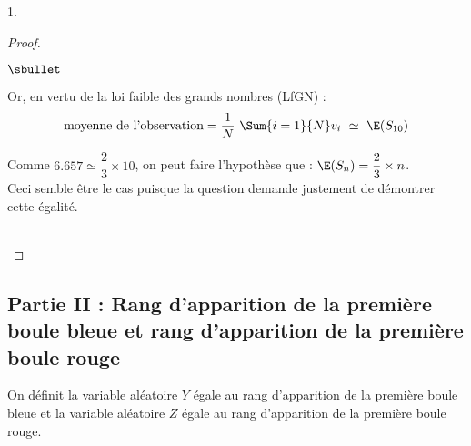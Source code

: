 \documentclass[11pt]{article}%
\begin{document}
\begin{noliste}{1.}
\begin{proof}
\begin{noliste}{$\sbullet$}
    \item Or, en vertu de la loi faible des grands nombres (LfGN) :
        \[
        \mbox{moyenne de l'observation} = \dfrac{1}{N} \ \Sum{i =
          1}{N} v_i \ \simeq \ \E(S_{10})
        \]

    \end{noliste}


    \newpage


    \begin{remarkL}{.97}
      Comme $6.657 \simeq \dfrac{2}{3} \times 10$, on peut faire
      l'hypothèse que : $\E(S_n) = \dfrac{2}{3} \times n$.\\
      Ceci semble être le cas puisque la question  demande
      justement de démontrer cette égalité.
    \end{remarkL}~\\[-1.4cm]
  \end{proof}
\end{noliste}

\subsection*{Partie II : Rang d'apparition de la première boule bleue 
et rang d'apparition de la première boule rouge}

\noindent 
On définit la variable aléatoire $Y$ égale au rang d'apparition de la
première boule bleue et la variable aléatoire $Z$ égale au rang
d'apparition de la première boule rouge.
\end{document}
